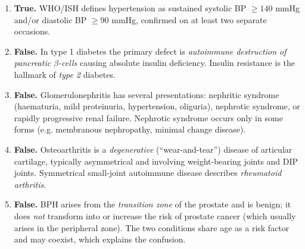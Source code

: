 \documentclass[11pt]{article}
\begin{document}
\begin{corrige}
\begin{enumerate}
\item \textbf{True.} WHO/ISH defines hypertension as sustained systolic BP $\ge 140$ mmHg and/or diastolic BP $\ge 90$ mmHg, confirmed on at least two separate occasions.
\item \textbf{False.} In type 1 diabetes the primary defect is \emph{autoimmune destruction of pancreatic $\beta$-cells} causing absolute insulin deficiency. Insulin resistance is the hallmark of \emph{type 2} diabetes.
\item \textbf{False.} Glomerulonephritis has several presentations: nephritic syndrome (haematuria, mild proteinuria, hypertension, oliguria), nephrotic syndrome, or rapidly progressive renal failure. Nephrotic syndrome occurs only in some forms (e.g. membranous nephropathy, minimal change disease).
\item \textbf{False.} Osteoarthritis is a \emph{degenerative} (``wear-and-tear'') disease of articular cartilage, typically asymmetrical and involving weight-bearing joints and DIP joints. Symmetrical small-joint autoimmune disease describes \emph{rheumatoid arthritis}.
\item \textbf{False.} BPH arises from the \emph{transition zone} of the prostate and is benign; it does \emph{not} transform into or increase the risk of prostate cancer (which usually arises in the peripheral zone). The two conditions share age as a risk factor and may coexist, which explains the confusion.
\end{enumerate}
\end{corrige}
\end{document}
